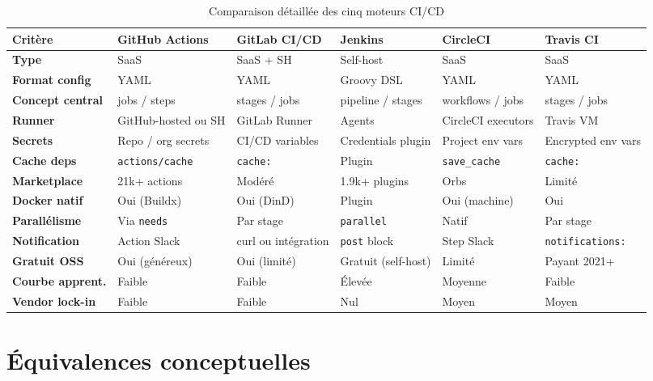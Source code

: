 \documentclass[12pt,a4paper]{report}
\begin{document}
\begin{table}[h!]
\centering
\scriptsize
\renewcommand{\arraystretch}{1.4}
\begin{tabular}{>{\bfseries}p{3.2cm} p{1.9cm} p{1.9cm} p{1.9cm} p{1.9cm} p{1.9cm}}
\toprule
Critère & GitHub Actions & GitLab CI/CD & Jenkins & CircleCI & Travis CI \\
\midrule
Type             & SaaS & SaaS + SH & Self-host & SaaS & SaaS \\
Format config    & YAML & YAML & Groovy DSL & YAML & YAML \\
Concept central  & jobs / steps & stages / jobs & pipeline / stages & workflows / jobs & stages / jobs \\
Runner           & GitHub-hosted ou SH & GitLab Runner & Agents & CircleCI executors & Travis VM \\
Secrets          & Repo / org secrets & CI/CD variables & Credentials plugin & Project env vars & Encrypted env vars \\
Cache deps       & \texttt{actions/cache} & \texttt{cache:} & Plugin & \texttt{save\_cache} & \texttt{cache:} \\
Marketplace      & 21k+ actions & Modéré & 1.9k+ plugins & Orbs & Limité \\
Docker natif     & Oui (Buildx) & Oui (DinD) & Plugin & Oui (machine) & Oui \\
Parallélisme     & Via \texttt{needs} & Par stage & \texttt{parallel} & Natif & Par stage \\
Notification     & Action Slack & curl ou intégration & \texttt{post} block & Step Slack & \texttt{notifications:} \\
Gratuit OSS      & Oui (généreux) & Oui (limité) & Gratuit (self-host) & Limité & Payant 2021+ \\
Courbe apprent.  & Faible & Faible & Élevée & Moyenne & Faible \\
Vendor lock-in   & Faible & Faible & Nul & Moyen & Moyen \\
\bottomrule
\end{tabular}
\caption{Comparaison détaillée des cinq moteurs CI/CD}
\label{tab:final-comparison}
\end{table}

\section{Équivalences conceptuelles}
\end{document}
